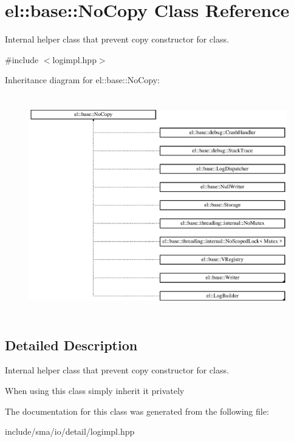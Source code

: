 \hypertarget{classel_1_1base_1_1NoCopy}{\section{el\-:\-:base\-:\-:No\-Copy Class Reference}
\label{classel_1_1base_1_1NoCopy}
}


Internal helper class that prevent copy constructor for class.  




{\ttfamily \#include $<$logimpl.\-hpp$>$}

Inheritance diagram for el\-:\-:base\-:\-:No\-Copy\-:\begin{figure}[H]
\begin{center}
\leavevmode
\includegraphics[height=9.625000cm]{classel_1_1base_1_1NoCopy}
\end{center}
\end{figure}


\subsection{Detailed Description}
Internal helper class that prevent copy constructor for class. 

When using this class simply inherit it privately 

The documentation for this class was generated from the following file\-:\begin{DoxyCompactItemize}
\item 
include/sma/io/detail/logimpl.\-hpp\end{DoxyCompactItemize}
